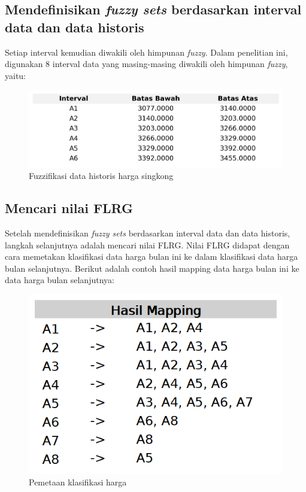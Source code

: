 \documentclass[conference]{IEEEtran}
\begin{document}
\subsection{Mendefinisikan \textit{fuzzy sets} berdasarkan interval data dan data historis}
Setiap interval kemudian diwakili oleh himpunan \textit{fuzzy}. Dalam penelitian ini, digunakan 8 interval data yang masing-masing diwakili oleh himpunan \textit{fuzzy}, yaitu:
\begin{figure}[H]
    \centering
    \includegraphics[scale=0.55]{images/intervals_table.jpg} 
    \caption{Fuzzifikasi data historis harga singkong}
\end{figure}

\subsection{Mencari nilai FLRG}
Setelah mendefinisikan \textit{fuzzy sets} berdasarkan interval data dan data historis, langkah selanjutnya adalah mencari nilai FLRG. Nilai FLRG didapat dengan cara memetakan klasifikasi data harga bulan ini ke dalam klasifikasi data harga bulan selanjutnya. Berikut adalah contoh hasil mapping data harga bulan ini ke data harga bulan selanjutnya:

\begin{figure}[H]
    \centering
    \includegraphics[scale=0.4]{images/hasil_mapping.png} 
    \caption{Pemetaan klasifikasi harga}
\end{figure}
\end{document}
